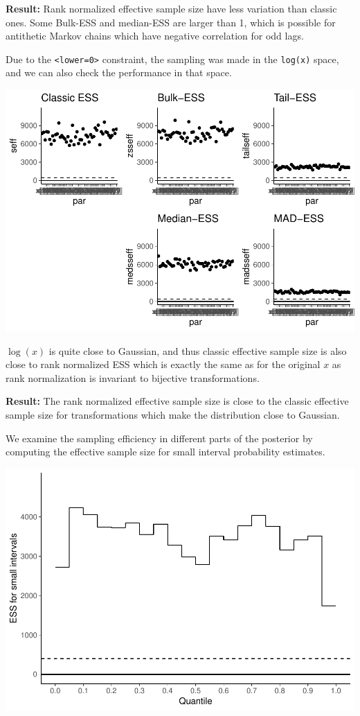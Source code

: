 \documentclass[american,]{article}
\begin{document}
\textbf{Result:} Rank normalized effective sample size have less
variation than classic ones. Some Bulk-ESS and median-ESS are larger
than 1, which is possible for antithetic Markov chains which have
negative correlation for odd lags.

Due to the \texttt{\textless{}lower=0\textgreater{}} constraint, the
sampling was made in the \texttt{log(x)} space, and we can also check
the performance in that space.

\includegraphics{graphics/ess-fit-half-nom-2-1.pdf}

\(\log(x)\) is quite close to Gaussian, and thus classic effective
sample size is also close to rank normalized ESS which is exactly the
same as for the original \(x\) as rank normalization is invariant to
bijective transformations.

\textbf{Result:} The rank normalized effective sample size is close to
the classic effective sample size for transformations which make the
distribution close to Gaussian.

We examine the sampling efficiency in different parts of the posterior
by computing the effective sample size for small interval probability
estimates.

\includegraphics{graphics/local-ess-fit-half-nom-1.pdf}
\end{document}
